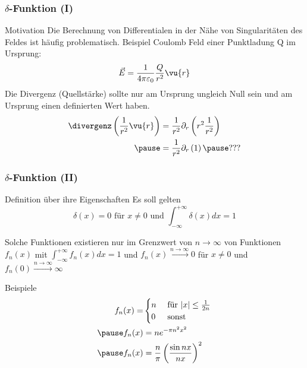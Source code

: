 \begin{frame}
  \frametitle{$\delta$-Funktion (I)}
  \begin{block}{Motivation}
    Die Berechnung von Differentialen in der Nähe von Singularitäten
    des Feldes ist häufig problematisch. Beispiel Coulomb Feld einer
    Punktladung Q im Ursprung:
    $$
    \vec{E} = \frac{1}{4\pi\varepsilon_0} \frac{Q}{r^2} \vu{r}
    $$
    Die Divergenz (Quellstärke) sollte nur am Ursprung ungleich Null
    sein und am Ursprung einen definierten Wert haben.
    \begin{align*}
      \divergenz \left( \frac{1}{r^2}\vu{r}\right) & = \frac{1}{r^2}
                                                  \partial_r \left(
                                                  r^2 \frac{1}{r^2}
                                                  \right)\\\pause
                                                  &= \frac{1}{r^2}
                                                  \partial_r \left(
                                                  1
                                                  \right)\pause \mbox{???}
      \end{align*}
    \end{block}
  
  \end{frame}
\begin{frame}
  \frametitle{$\delta$-Funktion (II)}
  \begin{block}{Definition über ihre Eigenschaften}
    Es soll gelten
    $$
    \delta(x)=0 \text{ für } x\neq 0 \text{ und }
    \int_{-\infty}^{+\infty} \delta(x) dx = 1
    $$\pause

  Solche Funktionen existieren nur im Grenzwert von $n\to\infty$ von
  Funktionen $f_n(x)$ mit $\int_{-\infty}^{+\infty} f_n(x) dx = 1$ und
  $f_n(x) \stackrel{n\to\infty}{\to}0$ für $x\neq 0$ und $f_n(0) \stackrel{n\to\infty}{\to}\infty$ 
\end{block}\pause

\begin{block}{Beispiele}
  \begin{align*}
    f_n(x)  = &
             \begin{cases}
               n & \text{ für } |x|\le\frac{1}{2n}\\
               0 & \text{ sonst } 
 \end{cases}\\\pause
   f_n(x)&= n e^{-\pi n^2x^2}\\\pause
   f_n(x) &= \frac{n}{\pi}\left( \frac{\sin nx}{nx} \right)^2
   \end{align*}
 \end{block}


  \end{frame}
